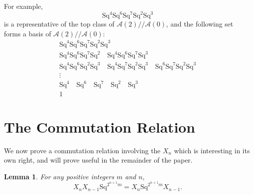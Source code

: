 \documentclass{article}
\newcommand{\A}{\mathcal{A}}
\newcommand{\Sq}{\mathrm{Sq}}
\newcommand{\mmod}{/\!/\!}
\newtheorem{lem}{Lemma}
\begin{document}
For example,
\[ \Sq^4\Sq^6\Sq^7\Sq^2\Sq^3 \]
is a representative of the top class of $\A(2)\mmod \A(0)$, and the following set forms a basis of $\A(2)\mmod \A(0)$:
\begin{gather*}
  \Sq^4\Sq^6\Sq^7\Sq^2\Sq^3 \\
  \Sq^4\Sq^6\Sq^7\Sq^2 \quad \Sq^4\Sq^6\Sq^7\Sq^3 \\
  \Sq^4\Sq^6\Sq^2\Sq^3 \quad \Sq^4\Sq^7\Sq^2\Sq^3 \quad \Sq^6\Sq^7\Sq^2\Sq^3 \\
  \vdots \\
  \Sq^4 \quad \Sq^6 \quad \Sq^7 \quad \Sq^2 \quad \Sq^3 \\
  1
\end{gather*}

\section{The Commutation Relation}\label{sec:commutation}

We now prove a commutation relation involving the $X_n$ which is interesting in its own right, and will prove useful in the remainder of the paper.

\begin{lem}\label{lem:commutation-relation}
  For any positive integers $m$ and $n$,
  \[X_nX_{n-1}\Sq^{2^{n+1}m} = X_n\Sq^{2^{n+1}m}X_{n-1}.\]
\end{lem}
\end{document}
